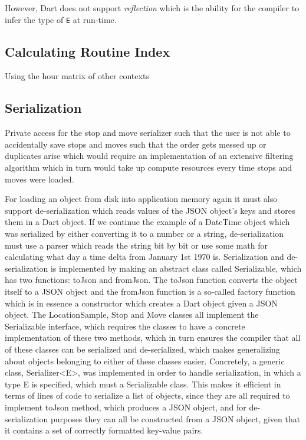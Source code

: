 However, Dart does not support \textit{reflection} which is the ability for the compiler to infer the type of \verb|E| at run-time.

\subsection{Calculating Routine Index}
Using the hour matrix of other contexts

\subsection{Serialization}
Private access for the stop and move serializer such that the user is not able to accidentally save stops and moves such that the order gets messed up or duplicates arise which would require an implementation of an extensive filtering algorithm which in turn would take up compute resources every time stops and moves were loaded.

For loading an object from disk into application memory again it must also support de-serialization which reads values of the JSON object's keys and stores them in a Dart object. If we continue the example of a DateTime object which was serialized by either converting it to a number or a string, de-serialization must use a parser which reads the string bit by bit or use some math for calculating what day a time delta from January 1st 1970 is. 
Serialization and de-serialization is implemented by making an abstract class called Serializable, which has two functions: toJson and fromJson. The toJson function converts the object itself to a JSON object and the fromJson function is a so-called factory function which is in essence a constructor which creates a Dart object given a JSON object. The LocationSample, Stop and Move classes all implement the Serializable interface, which requires the classes to have a concrete implementation of these two methods, which in turn ensures the compiler that all of these classes can be serialized and de-serialized, which makes generalizing about objects belonging to either of these classes easier. Concretely, a generic class, Serializer<E>, was implemented in order to handle serialization, in which a type E is specified, which must a Serializable class. This makes it efficient in terms of lines of code to serialize a list of objects, since they are all required to implement toJson method, which produces a JSON object, and for de-serialization purposes they can all be constructed from a JSON object, given that it contains a set of correctly formatted key-value pairs.

